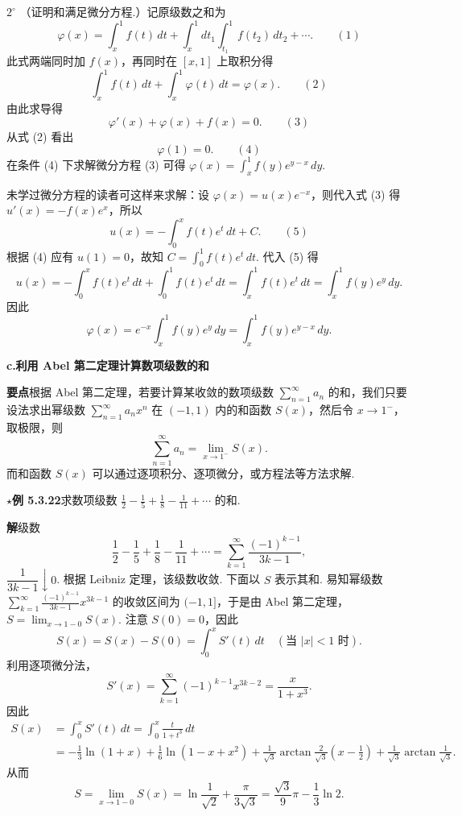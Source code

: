 \documentclass[UTF8, 12pt, fontset=fandol, oneside]{ctexart}
\begin{document}
$2^\circ$ （证明和满足微分方程.）记原级数之和为
\[
  \varphi(x)=\int_x^1 f(t)\,dt+\int_x^1dt_1\int_{t_1}^1 f(t_2)\,dt_2+\cdots. \qquad(1)
\]
此式两端同时加 $f(x)$，再同时在 $[x,1]$ 上取积分得
\[
  \int_x^1 f(t)\,dt+\int_x^1\varphi(t)\,dt=\varphi(x). \qquad(2)
\]
由此求导得
\[
  \varphi'(x)+\varphi(x)+f(x)=0. \qquad(3)
\]
从式 (2) 看出
\[
  \varphi(1)=0. \qquad(4)
\]
在条件 (4) 下求解微分方程 (3) 可得
$\displaystyle\varphi(x)=\int_x^1 f(y)e^{y-x}\,dy$.

未学过微分方程的读者可这样来求解：设 $\varphi(x)=u(x)e^{-x}$，则代入式 (3) 得
$u'(x)=-f(x)e^x$，所以
\[
  u(x)=-\int_0^x f(t)e^t\,dt+C. \qquad(5)
\]
根据 (4) 应有 $u(1)=0$，故知 $C=\displaystyle\int_0^1 f(t)e^t\,dt$. 代入 (5) 得
\[
  u(x)=-\int_0^x f(t)e^t\,dt+\int_0^1 f(t)e^t\,dt
  =\int_x^1 f(t)e^t\,dt=\int_x^1 f(y)e^y\,dy.
\]
因此
\[
  \varphi(x)=e^{-x}\int_x^1 f(y)e^y\,dy
  =\int_x^1 f(y)e^{y-x}\,dy.
\]

\noindent\textbf{c.\quad 利用 Abel 第二定理计算数项级数的和}

\noindent\textbf{要点}\quad 根据 Abel 第二定理，若要计算某收敛的数项级数
$\displaystyle\sum_{n=1}^{\infty}a_n$ 的和，我们只要设法求出幂级数
$\displaystyle\sum_{n=1}^{\infty}a_nx^n$ 在 $(-1,1)$ 内的和函数 $S(x)$，然后令 $x\to1^-$，取极限，则
\[
  \sum_{n=1}^{\infty}a_n=\lim_{x\to1^-}S(x).
\]
而和函数 $S(x)$ 可以通过逐项积分、逐项微分，或方程法等方法求解.

\noindent\(\star\)\textbf{例 5.3.22}\quad 求数项级数
$\displaystyle\frac12-\frac15+\frac18-\frac1{11}+\cdots$ 的和.

\noindent\textbf{解}\quad 级数
\[
  \frac12-\frac15+\frac18-\frac1{11}+\cdots
  =\sum_{k=1}^{\infty}\frac{(-1)^{k-1}}{3k-1},
\]
$\dfrac1{3k-1}\downarrow0$. 根据 Leibniz 定理，该级数收敛. 下面以 $S$ 表示其和. 易知幂级数
$\displaystyle\sum_{k=1}^{\infty}\frac{(-1)^{k-1}}{3k-1}x^{3k-1}$ 的收敛区间为 $(-1,1]$，于是由 Abel 第二定理，
$S=\displaystyle\lim_{x\to1-0}S(x)$. 注意 $S(0)=0$，因此
\[
  S(x)=S(x)-S(0)=\int_0^x S'(t)\,dt\quad(\text{当 }|x|<1\text{ 时}).
\]
利用逐项微分法，
\[
  S'(x)=\sum_{k=1}^{\infty}(-1)^{k-1}x^{3k-2}=\frac{x}{1+x^3}.
\]
因此
\[
\begin{aligned}
S(x)
&=\int_0^x S'(t)\,dt=\int_0^x\frac{t}{1+t^3}\,dt\\
&=-\frac13\ln(1+x)+\frac16\ln(1-x+x^2)
+\frac1{\sqrt3}\arctan\frac2{\sqrt3}\left(x-\frac12\right)
+\frac1{\sqrt3}\arctan\frac1{\sqrt3}.
\end{aligned}
\]
从而
\[
  S=\lim_{x\to1-0}S(x)=\ln\frac1{\sqrt2}+\frac{\pi}{3\sqrt3}
  =\frac{\sqrt3}{9}\pi-\frac13\ln2.
\]
\end{document}
